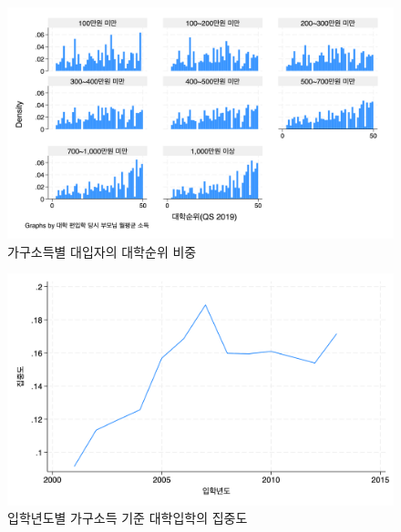 \documentclass[aspectratio=169,xcolor=dvipsnames,handout]{beamer}
\begin{document}
\begin{frame}[<+->]
    \begin{figure}
        \centering
        \includegraphics[width=.75\textwidth]{pic/edug2.png}
        \caption{가구소득별 대입자의 대학순위 비중}
    \end{figure}
\end{frame}

\begin{frame}[<+->]
    \begin{figure}
        \centering
        \includegraphics[width=.75\textwidth]{pic/edug3.png}
        \caption{입학년도별 가구소득 기준 대학입학의 집중도}
    \end{figure}
\end{frame}
\end{document}
